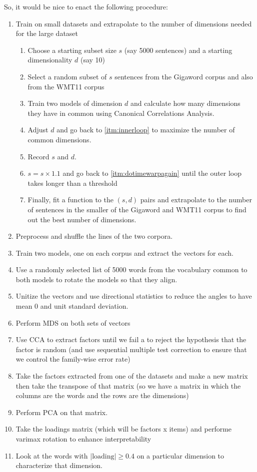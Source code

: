 So, it would be nice to enact the following procedure:
\begin{enumerate}
 \item Train on small datasets and extrapolate to the number of dimensions 
 needed for the large dataset
 \begin{enumerate}
    \item Choose a starting subset size $s$ (say 5000 sentences) and a starting
    dimensionality $d$ (say 10)
    \item \label{itm:dotimewarpagain} Select a random subset of $s$ sentences 
    from the Gigaword corpus and also from the WMT11 corpus
    \item \label{itm:innerloop} Train two models of dimension $d$ and calculate
    how many dimensions they have in common using Canonical Correlations Analysis.
    \item Adjust $d$ and go back to \ref{itm:innerloop} to maximize the number 
    of common dimensions.
    \item Record $s$ and $d$.
    \item $s = s\times 1.1$ and go back to \ref{itm:dotimewarpagain} until
    the outer loop takes longer than a threshold
    \item Finally, fit a function to the $(s,d)$ pairs and extrapolate to the 
    number of sentences in the smaller of the Gigaword and WMT11 corpus to find
    out the best number of dimensions.
 \end{enumerate}
 \item Preprocess and shuffle the lines of the two corpora.
 \item Train two models, one on each corpus and extract the vectors for each.
 \item Use a randomly selected list of 5000 words from the vocabulary common 
 to both models to rotate the models so that they align.
 \item Unitize the vectors and use directional statistics to reduce the angles
 to have mean 0 and unit standard deviation.
 \item Perform MDS on both sets of vectors
 \item Use CCA to extract factors until we fail a to reject the hypothesis that
 the factor is random (and use sequential multiple test correction to ensure
 that we control the family-wise error rate)
 \item Take the factors extracted from one of the datasets and make a new matrix
 then take the transpose of that matrix (so we have a matrix in which the 
 columns are the words and the rows are the \modelname{} dimensions)
 \item Perform PCA on that matrix. 
 \item Take the loadings matrix (which will be factors x items) and performe
 varimax rotation to enhance interpretability
 \item Look at the words with $|\text{loading}| \ge 0.4$ on a particular 
 dimension to characterize that dimension.
\end{enumerate}


